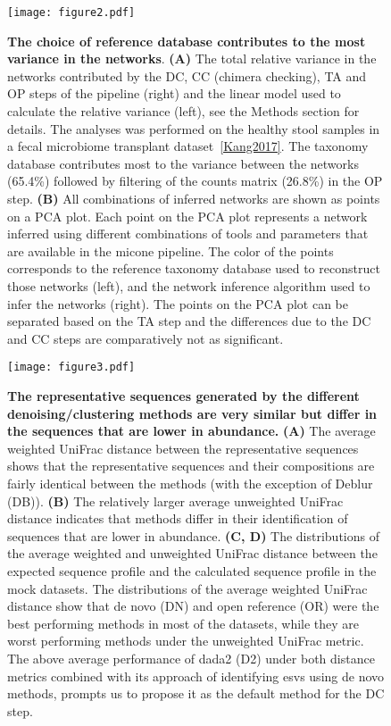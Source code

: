  \begin{figure}
    \centering
    \texttt{[image: figure2.pdf]}
  \end{figure}
  \begin{figure}
    \centering
      \caption{
      \textbf{The choice of reference database contributes to the most variance in the networks}.
      \textbf{(A)} The total relative variance in the networks contributed by the DC, CC (chimera checking), TA and OP steps of the pipeline (right) and the linear model used to calculate the relative variance (left), see the Methods section for details.
      The analyses was performed on the healthy stool samples in a fecal microbiome transplant dataset~\ref{Kang2017}.
      The taxonomy database contributes most to the variance between the networks (65.4\%) followed by filtering of the counts matrix (26.8\%) in the OP step.
      \textbf{(B)} All combinations of inferred networks are shown as points on a PCA plot.
      Each point on the PCA plot represents a network inferred using different combinations of tools and parameters that are available in the \ac{micone} pipeline.
      The color of the points corresponds to the reference taxonomy database used to reconstruct those networks (left), and the network inference algorithm used to infer the networks (right).
      The points on the PCA plot can be separated based on the TA step and the differences due to the DC and CC steps are comparatively not as significant.
    }
    \label{fig:figure2}
  \end{figure}
  \FloatBarrier
  \newpage

  \begin{figure}
    \centering
    \texttt{[image: figure3.pdf]}
  \end{figure}
  \begin{figure}
    \centering
    \caption{
      \textbf{The representative sequences generated by the different denoising/clustering methods are very similar but differ in the sequences that are lower in abundance.}
      \textbf{(A)} The average weighted UniFrac distance between the representative sequences shows that the representative sequences and their compositions are fairly identical between the methods (with the exception of Deblur (DB)).
      \textbf{(B)} The relatively larger average unweighted UniFrac distance indicates that methods differ in their identification of sequences that are lower in abundance.
      \textbf{(C, D)} The distributions of the average weighted and unweighted UniFrac distance between the expected sequence profile and the calculated sequence profile in the mock datasets.
      The distributions of the average weighted UniFrac distance show that de novo (DN) and open reference (OR) were the best performing methods in most of the datasets, while they are worst performing methods under the unweighted UniFrac metric.
      The above average performance of dada2 (D2) under both distance metrics combined with its approach of identifying \ac{esv}s using de novo methods, prompts us to propose it as the default method for the DC step.
    }
    \label{fig:figure3}
  \end{figure}
  \FloatBarrier
  \newpage

